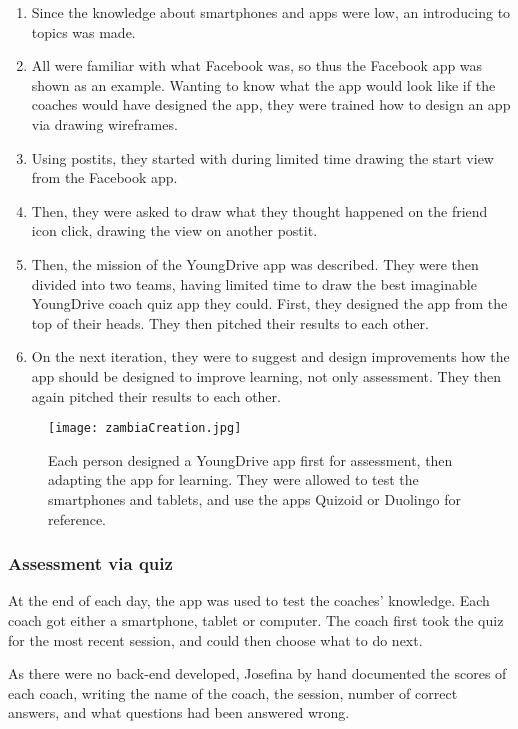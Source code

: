 \begin{enumerate}
\item Since the knowledge about smartphones and apps were low, an introducing to topics was made.
\item All were familiar with what Facebook was, so thus the Facebook app was shown as an example. Wanting to know what the app would look like if the coaches would have designed the app, they were trained how to design an app via drawing wireframes.
\item Using postits, they started with during limited time drawing the start view from the Facebook app.
\item Then, they were asked to draw what they thought happened on the friend icon click, drawing the view on another postit.
\item Then, the mission of the YoungDrive app was described. They were then divided into two teams, having limited time to draw the best imaginable YoungDrive coach quiz app they could. First, they designed the app from the top of their heads. They then pitched their results to each other.
\item On the next iteration, they were to suggest and design improvements how the app should be designed to improve learning, not only assessment. They then again pitched their results to each other.
\end{enumerate}

\begin{figure}[h]
    \centering
    \texttt{[image: zambiaCreation.jpg]}
    \caption{Each person designed a YoungDrive app first for assessment, then adapting the app for learning. They were allowed to test the smartphones and tablets, and use the apps Quizoid or Duolingo for reference.}
    \label{fig:iteration}
\end{figure}

\subsubsection{Assessment via quiz}
At the end of each day, the app was used to test the coaches' knowledge. Each coach got either a smartphone, tablet or computer. The coach first took the quiz for the most recent session, and could then choose what to do next.

As there were no back-end developed, Josefina by hand documented the scores of each coach, writing the name of the coach, the session, number of correct answers, and what questions had been answered wrong.

